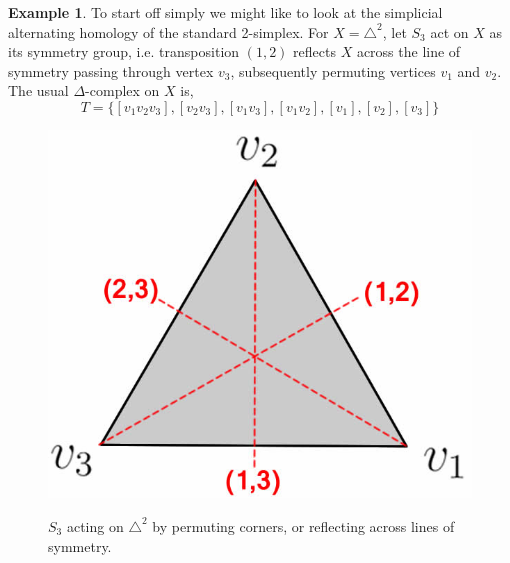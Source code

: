 \documentclass[11pt,a4paper,twoside]{article}
\theoremstyle{plain}
\theoremstyle{definition}
\theoremstyle{definition}
\theoremstyle{definition}
\theoremstyle{definition}
\newtheorem{example}[thm]{Example}
\theoremstyle{definition}
\begin{document}
\vspace{2mm}
\begin{example}
\label{Barycentric2Simplex}
To start off simply we might like to look at the simplicial alternating homology of the standard 2-simplex. For $X=\triangle^2$, let $S_3$ act on $X$ as its symmetry group, i.e. transposition $(1,2)$ reflects $X$ across the line of symmetry passing through vertex $v_3$, subsequently permuting vertices $v_1$ and $v_2$. The usual $\Delta$-complex on $X$ is,
$$T=\{[v_1 v_2 v_3],[v_2 v_3],[v_1 v_3],[v_1 v_2],[v_1],[v_2],[v_3]\}$$
\begin{figure}
\centering
\begin{minipage}{.47\textwidth}
  \centering
\includegraphics[scale=0.2]{Images/Standard2Simplex.jpg}
\label{S3On2Simplex}
\caption{$S_3$ acting on $\triangle^2$ by permuting corners, or reflecting across lines of symmetry.}


\end{minipage}
\end{figure}
\end{example}
\end{document}
